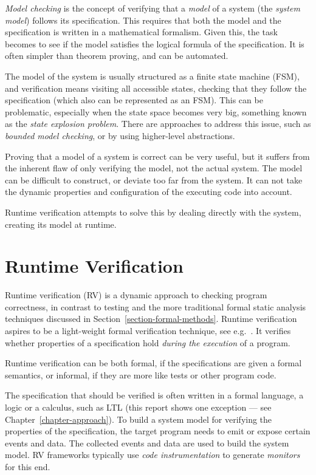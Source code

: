 \documentclass[a4paper,11pt]{kth-mag}
\begin{document}
\textit{Model checking} is the concept of verifying that a \textit{model} of a
system (the \textit{system model}) follows its specification. This requires
that both the model and the specification is written in a mathematical
formalism. Given this, the task becomes to see if the model satisfies the
logical formula of the specification. It is often simpler than theorem proving,
and can be automated.

The model of the system is usually structured as a finite state machine (FSM),
and verification means visiting all accessible states, checking that they
follow the specification (which also can be represented as an FSM). This can be
problematic, especially when the state space becomes very big, something known
as the \textit{state explosion problem}. There are approaches to address this
issue, such as \textit{bounded model checking}, or by using higher-level
abstractions.

Proving that a model of a system is correct can be very useful, but it suffers
from the inherent flaw of only verifying the model, not the actual system. The
model can be difficult to construct, or deviate too far from the system. It can
not take the dynamic properties and configuration of the executing code into
account.

Runtime verification attempts to solve this by dealing directly with the
system, creating its model at runtime.


\section{Runtime Verification} \label{section-rv}

Runtime verification (RV) is a dynamic approach to checking program
correctness, in contrast to testing and the more traditional formal static
analysis techniques discussed in Section~\ref{section-formal-methods}.  Runtime
verification aspires to be a light-weight formal verification technique, see
e.g.\ \cite{leucker09abriefaccount,delgado04taxonomy}. It verifies whether
properties of a specification hold \textit{during the execution} of a program.

Runtime verification can be both formal, if the specifications are given a
formal semantics, or informal, if they are more like tests or other program
code.

The specification that should be verified is often written in a formal
language, a logic or a calculus, such as LTL \cite{pnueli77} (this report shows
one exception --- see Chapter~\ref{chapter-approach}). To build a system model
for verifying the properties of the specification, the target program needs to
emit or expose certain events and data. The collected events and data are used
to build the system model. RV frameworks typically use \textit{code
instrumentation} to generate \textit{monitors} for this end.
\end{document}
